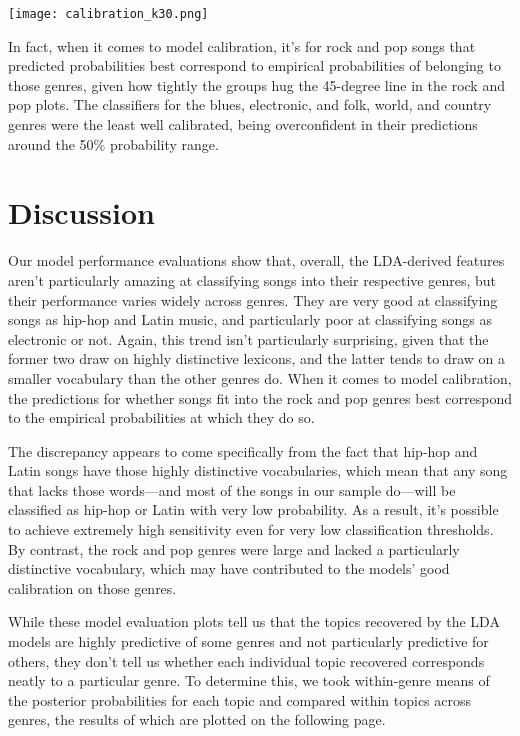 \documentclass[12pt, titlepage]{article}
\begin{document}
\begin{center}
    \texttt{[image: calibration\_k30.png]}
\end{center}

In fact, when it comes to model calibration, it's for rock and pop songs that predicted probabilities best correspond to empirical probabilities of belonging to those genres, given how tightly the groups hug the 45-degree line in the rock and pop plots. The classifiers for the blues, electronic, and folk, world, and country genres were the least well calibrated, being overconfident in their predictions around the 50\% probability range. 

\section{Discussion}
Our model performance evaluations show that, overall, the LDA-derived features aren't particularly amazing at classifying songs into their respective genres, but their performance varies widely across genres. They are very good at classifying songs as hip-hop and Latin music, and particularly poor at classifying songs as electronic or not. Again, this trend isn't particularly surprising, given that the former two draw on highly distinctive lexicons, and the latter tends to draw on a smaller vocabulary than the other genres do. When it comes to model calibration, the predictions for whether songs fit into the rock and pop genres best correspond to the empirical probabilities at which they do so. 

The discrepancy appears to come specifically from the fact that hip-hop and Latin songs have those highly distinctive vocabularies, which mean that any song that lacks those words---and most of the songs in our sample do---will be classified as hip-hop or Latin with very low probability. As a result, it's possible to achieve extremely high sensitivity even for very low classification thresholds. By contrast, the rock and pop genres were large and lacked a particularly distinctive vocabulary, which may have contributed to the models' good calibration on those genres.

While these model evaluation plots tell us that the topics recovered by the LDA models are highly predictive of some genres and not particularly predictive for others, they don't tell us whether each individual topic recovered corresponds neatly to a particular genre. To determine this, we took within-genre means of the posterior probabilities for each topic and compared within topics across genres, the results of which are plotted on the following page.
\end{document}
